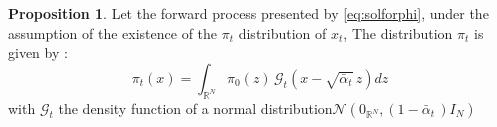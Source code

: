\documentclass[a4paper,10pt]{article}
\theoremstyle{definition} %
\theoremstyle{definition} %
\newtheorem{proposition}[definition]{Proposition}
\theoremstyle{definition} %
\theoremstyle{definition} %
\newcommand{\R}{\mathbb{R}}
\newcommand{\0}{\boldsymbol{0}}
\begin{document}
\begin{proposition}\label{prop:distribution_a_etap_t}
    Let the forward process presented by \cref{eq:solforphi}, under the assumption of the existence of the $\pi_t$ distribution of $x_t$, The distribution $\pi_t$ is given by :    \begin{equation}\label{eq:distribution_pi_t}
        \pi_t(x) = \int_{\R^N} \pi_0(z)\, \mathcal{G}_t(x - \sqrt{\bar \alpha_t}\,z) dz
    \end{equation}
    with $\mathcal{G}_t$ the density function of a normal distribution$\mathcal{N}\left(0_{\R^N}, (1- \bar\alpha _t \,)I_N\right)$
\end{proposition}
\end{document}

